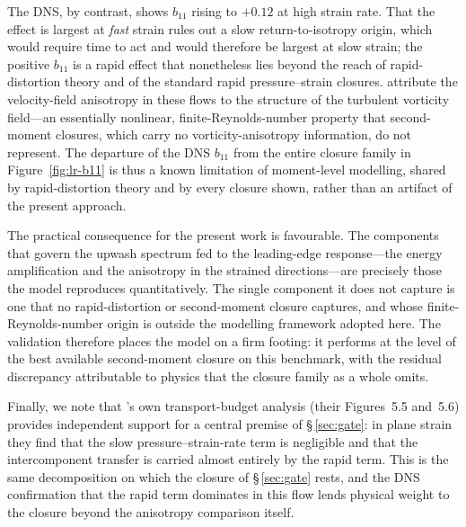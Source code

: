 \documentclass[lineno]{JFM-FLM_Au}
\begin{document}
The DNS, by contrast, shows $b_{11}$ rising to $+0.12$ at high strain rate. That
the effect is largest at \emph{fast} strain rules out a slow return-to-isotropy
origin, which would require time to act and would therefore be largest at slow
strain; the positive $b_{11}$ is a rapid effect that nonetheless lies beyond the
reach of rapid-distortion theory and of the standard rapid pressure--strain
closures. \citet{LeeReynolds1985} attribute the velocity-field anisotropy in
these flows to the structure of the turbulent vorticity field---an essentially
nonlinear, finite-Reynolds-number property that second-moment closures, which
carry no vorticity-anisotropy information, do not represent. The departure of the
DNS $b_{11}$ from the entire closure family in Figure~\ref{fig:lr-b11} is thus a
known limitation of moment-level modelling, shared by rapid-distortion theory and
by every closure shown, rather than an artifact of the present approach.

The practical consequence for the present work is favourable. The components that
govern the upwash spectrum fed to the leading-edge response---the energy
amplification and the anisotropy in the strained directions---are precisely those
the model reproduces quantitatively. The single component it does not capture is
one that no rapid-distortion or second-moment closure captures, and whose
finite-Reynolds-number origin is outside the modelling framework adopted here. The
validation therefore places the model on a firm footing: it performs at the level
of the best available second-moment closure on this benchmark, with the residual
discrepancy attributable to physics that the closure family as a whole omits.

Finally, we note that \citeauthor{LeeReynolds1985}'s own transport-budget analysis
(their Figures~5.5 and~5.6) provides independent support for a central premise of
\S\,\ref{sec:gate}: in plane strain they find that the slow pressure--strain-rate
term is negligible and that the intercomponent transfer is carried almost entirely
by the rapid term. This is the same decomposition on which the closure of
\S\,\ref{sec:gate} rests, and the DNS confirmation that the rapid term dominates in
this flow lends physical weight to the closure beyond the anisotropy comparison
itself.








\end{document}
